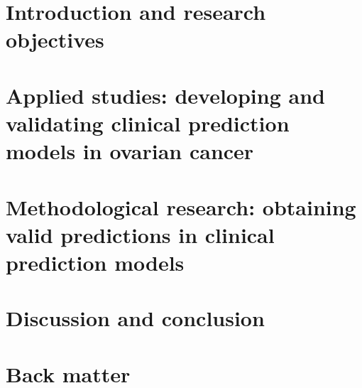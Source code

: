 \documentclass[11pt,twoside,a4paper]{thesislayout}
\begin{document}
\part{Introduction and research objectives}
\label{part:intro}




\part{Applied studies: developing and validating clinical prediction models in ovarian cancer}
\label{part:applied}





\part{Methodological research: obtaining valid predictions in clinical prediction models}
\label{part:methods}






\part{Discussion and conclusion}
\label{part:discussion}


 


\renewcommand*{\bibfont}{\footnotesize}
\printbibliography[heading=bibintoc]

\part{Back matter}
\label{part:backmatter}
\markboth{}{}





\makebackcover


\end{document}
